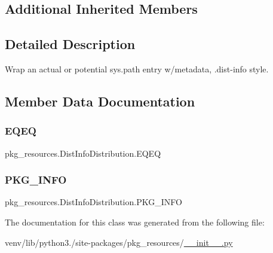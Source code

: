 \subsection*{Additional Inherited Members}


\subsection{Detailed Description}
\begin{DoxyVerb}Wrap an actual or potential sys.path entry
w/metadata, .dist-info style.
\end{DoxyVerb}
 

\subsection{Member Data Documentation}
\mbox{\label{classpkg__resources_1_1DistInfoDistribution_a46319d8886527d84f930481eb4d2d3c2}} 
\subsubsection{\texorpdfstring{E\+Q\+EQ}{EQEQ}}
{\footnotesize\ttfamily pkg\+\_\+resources.\+Dist\+Info\+Distribution.\+E\+Q\+EQ\hspace{0.3cm}{\ttfamily [static]}}

\mbox{\label{classpkg__resources_1_1DistInfoDistribution_a2b24a6b0e93b2df66840f1a7b0b5015f}} 
\subsubsection{\texorpdfstring{P\+K\+G\+\_\+\+I\+N\+FO}{PKG\_INFO}}
{\footnotesize\ttfamily pkg\+\_\+resources.\+Dist\+Info\+Distribution.\+P\+K\+G\+\_\+\+I\+N\+FO\hspace{0.3cm}{\ttfamily [static]}}



The documentation for this class was generated from the following file\+:\begin{DoxyCompactItemize}
\item 
venv/lib/python3./site-\/packages/pkg\+\_\+resources/\hyperlink{venv_2lib_2python3_89_2site-packages_2pkg__resources_2____init_____8py}{\+\_\+\+\_\+init\+\_\+\+\_\+.\+py}\end{DoxyCompactItemize}
